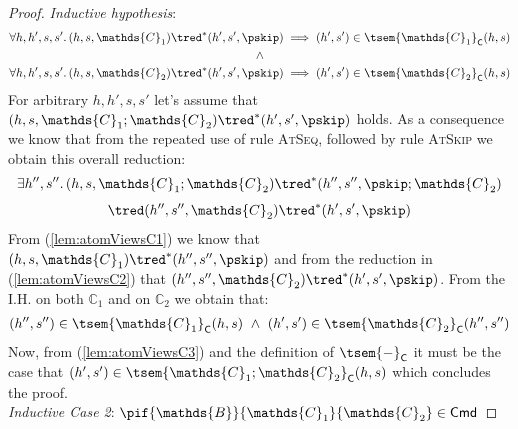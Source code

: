 \begin{lem}
{\begin{proof}
	\textit{Inductive hypothesis}:
	\begin{gather*}
		\forall h, h', s, s' \ldotp
		(h, s, \mathds{C}_1) \tred^* (h', s', \pskip)
		\implies
		(h', s') \in \tsem{\mathds{C}_1}_\mathsf{C}(h, s) \\
		\land \\
		\forall h, h', s, s' \ldotp
		(h, s, \mathds{C}_2) \tred^* (h', s', \pskip)
		\implies
		(h', s') \in \tsem{\mathds{C}_2}_\mathsf{C}(h, s)
	\end{gather*}
	For arbitrary $h, h', s, s'$ let's assume that $(h, s, \mathds{C}_1 ; \mathds{C}_2) \tred^* (h', s', \pskip)$ holds. As a consequence we know that from the repeated use of rule \textsc{AtSeq}, followed by rule \textsc{AtSkip} we obtain this overall reduction:
	\begin{gather}
		\label{lem:atomViewsC1}
		\exists h'', s'' \ldotp (h, s, \mathds{C}_1 ; \mathds{C}_2)
			\tred^*
		(h'', s'', \pskip ; \mathds{C}_2) \\[0.4em]
		\label{lem:atomViewsC2}
			\tred
		(h'', s'', \mathds{C}_2)
			\tred^*
		(h', s', \pskip)
	\end{gather}
	From (\ref{lem:atomViewsC1}) we know that $(h, s, \mathds{C}_1) \tred^* (h'', s'', \pskip)$ and from the reduction in (\ref{lem:atomViewsC2}) that $(h'', s'', \mathds{C}_2) \tred^* (h', s', \pskip)$. From the I.H. on both $\mathds{C}_1$ and on $\mathds{C}_2$ we obtain that:
	\begin{gather}
		\label{lem:atomViewsC3}
		(h'', s'') \in \tsem{\mathds{C}_1}_\mathsf{C}(h, s)\
		\land\
		(h', s') \in \tsem{\mathds{C}_2}_\mathsf{C}(h'', s'')
	\end{gather}
	Now, from (\ref{lem:atomViewsC3}) and the definition of $\tsem{-}_\mathsf{C}$ it must be the case that $(h', s') \in \tsem{\mathds{C}_1 ; \mathds{C}_2}_\mathsf{C}(h, s)$ which concludes the proof. \\
	
	\textit{Inductive Case 2}: $\pif{\mathds{B}}{\mathds{C}_1}{\mathds{C}_2} \in \mathsf{Cmd}$
	

\end{proof}}
\end{lem}
